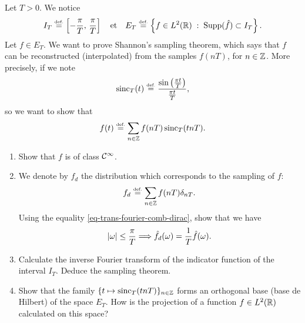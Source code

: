  
\begin{exo}
\label{exo-sample-shannon}
 
   Let $ T> 0 $. We notice
\begin{equation*}
I_T \stackrel{\mbox{\upshape\tiny def.}}{=} \left[- \frac{\pi}{T}, \, \frac{\pi}{T} \right] \quad \text{et} \quad E_T \stackrel{\mbox{\upshape\tiny def.}}{=} \left\{ f \in L^2 (\mathbb{R}) \;:\; \operatorname{Supp} (\hat{f}) \subset I_T \right\}.
\end{equation*}
Let $ f \in E_T $. We want to prove Shannon's sampling theorem, which says that $ f $ can be reconstructed (interpolated) from the samples $ f(n T) $, for $ n \in \mathbb{Z} $. More precisely, if we note
\begin{equation}
\label{eqn-formula-reconstruction-shannon}
\operatorname{sinc}_T (t) \stackrel{\mbox{\upshape\tiny def.}}{=} \frac{\sin \left(\frac{\pi t}{T} \right)}{\frac{\pi t}{T}},
\end{equation}
so we want to show that
\begin{equation*}
f(t) \stackrel{\mbox{\upshape\tiny def.}}{=} \sum_{n \in \mathbb{Z}}{f(n T) \operatorname{sinc}_T (tn T)}.
\end{equation*}
\begin{enumerate}
\item Show that $ f $ is of class $ \mathcal{C}^\infty $.
\item We denote by $ f_d $ the distribution which corresponds to the sampling of $ f $:
\begin{equation*}
f_d \stackrel{\mbox{\upshape\tiny def.}}{=} \sum_{n \in \mathbb{Z}}{f(n T) \delta_{n T}}.
\end{equation*}
Using the equality \eqref{eq-trans-fourier-comb-dirac}, show that we have
\begin{equation*}
| \omega | \leq \frac{\pi}{T} \Longrightarrow \hat{f_d} (\omega) = \frac{1}{T} \hat{f} (\omega).
\end{equation*}
 
\item Calculate the inverse Fourier transform of the indicator function of the interval $ I_T $. Deduce the sampling theorem.
\item {}  Show that the family $ \{t \mapsto \operatorname{sinc}_T (t n T)\}_{n \in \mathbb{Z}} $ forms an orthogonal base (base de Hilbert) of the space $ E_T $. How is the projection of a function $ f \in L^2 (\mathbb{R}) $ calculated on this space?
\end{enumerate}
\end{exo}